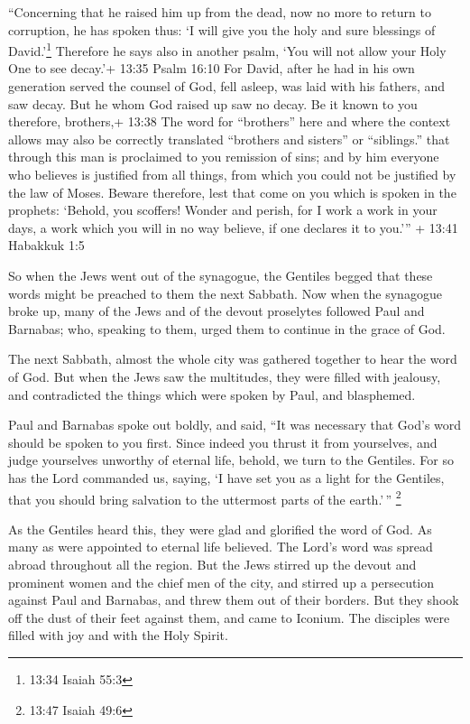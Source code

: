  ``Concerning that he raised him up from the dead, now no
more to return to corruption, he has spoken thus: `I will give you the
holy and sure blessings of David.'\footnote{13:34 Isaiah 55:3}
 Therefore he says also in another psalm, `You will not
allow your Holy One to see decay.'+ 13:35 Psalm 16:10  For
David, after he had in his own generation served the counsel of God,
fell asleep, was laid with his fathers, and saw decay.  But
he whom God raised up saw no decay.  Be it known to you
therefore, brothers,+ 13:38 The word for ``brothers'' here and where the
context allows may also be correctly translated ``brothers and sisters''
or ``siblings.'' that through this man is proclaimed to you remission of
sins;  and by him everyone who believes is justified from
all things, from which you could not be justified by the law of Moses.
 Beware therefore, lest that come on you which is spoken in
the prophets:  `Behold, you scoffers! Wonder and perish,
for I work a work in your days, a work which you will in no way believe,
if one declares it to you.''' + 13:41 Habakkuk 1:5

 So when the Jews went out of the synagogue, the Gentiles
begged that these words might be preached to them the next Sabbath.
 Now when the synagogue broke up, many of the Jews and of
the devout proselytes followed Paul and Barnabas; who, speaking to them,
urged them to continue in the grace of God.

 The next Sabbath, almost the whole city was gathered
together to hear the word of God.  But when the Jews saw
the multitudes, they were filled with jealousy, and contradicted the
things which were spoken by Paul, and blasphemed.

 Paul and Barnabas spoke out boldly, and said, ``It was
necessary that God's word should be spoken to you first. Since indeed
you thrust it from yourselves, and judge yourselves unworthy of eternal
life, behold, we turn to the Gentiles.  For so has the Lord
commanded us, saying, `I have set you as a light for the Gentiles, that
you should bring salvation to the uttermost parts of the earth.'\,''
\footnote{13:47 Isaiah 49:6}

 As the Gentiles heard this, they were glad and glorified
the word of God. As many as were appointed to eternal life believed.
 The Lord's word was spread abroad throughout all the
region.  But the Jews stirred up the devout and prominent
women and the chief men of the city, and stirred up a persecution
against Paul and Barnabas, and threw them out of their borders.
 But they shook off the dust of their feet against them,
and came to Iconium.  The disciples were filled with joy
and with the Holy Spirit.

